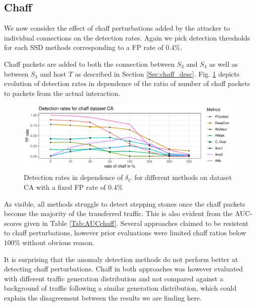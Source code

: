 \documentclass[runningheads,11pt]{llncs}\usepackage[]{graphicx}\usepackage[]{color}
\makeatletter
\def\maxwidth{ %
  \ifdim\Gin@nat@width>\linewidth
    \linewidth
  \else
    \Gin@nat@width
  \fi
}
\newenvironment{knitrout}{}{} %
\makeatother
\begin{document}
\subsection{Chaff}

We now consider the effect of chaff perturbations added by the attacker to individual connections on the detection rates. Again we pick detection thresholds for each SSD methods corresponding to a FP rate of $0.4\%$.%

Chaff packets are added to both the connection between $S_3$ and $S_4$ as well as between $S_4$ and host $T$ as described in Section \ref{Sec:chaff_desc}. Fig. \ref{fig:Chaffdetection} depicts evolution of detection rates in dependence of the ratio of number of chaff packets to packets from the actual interaction.


\begin{knitrout}
\color{fgcolor}\begin{figure}
\includegraphics[width=\maxwidth]{figure/Chaffdetection-1} \caption[Detection rates in dependence of $\delta_C$ for different methods on dataset CA with a fixed FP rate of $0.4\%$]{Detection rates in dependence of $\delta_C$ for different methods on dataset CA with a fixed FP rate of $0.4\%$}\label{fig:Chaffdetection}
\end{figure}


\end{knitrout}

As visible, all methods struggle to detect stepping stones once the chaff packets become the majority of the transferred traffic. This is also evident from the AUC-scores given in Table \ref{Tab:AUCchaff}. Several approaches claimed to be resistent to chaff perturbations, however prior evaluations were limited chaff ratios below $100\%$ without obvious reason.

It is surprising that the anomaly detection methods do not perform better at detecting chaff perturbations. Chaff in both approaches was however evaluated with different traffic generation distribution and not compared against a background of traffic following a similar generation distribution, which could explain the disagreement between the results we are finding here.
\end{document}

